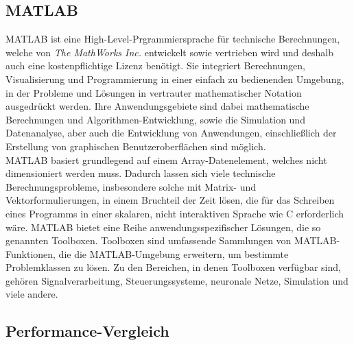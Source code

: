 
\subsection{MATLAB}

MATLAB ist eine High-Level-Prgrammiersprache für technische Berechnungen, welche von \textit{The MathWorks Inc.} entwickelt sowie vertrieben wird und deshalb auch eine kostenpflichtige Lizenz benötigt. Sie integriert Berechnungen, Visualisierung und Programmierung in einer einfach zu bedienenden Umgebung, in der Probleme und Lösungen in vertrauter mathematischer Notation ausgedrückt werden. Ihre Anwendungsgebiete sind dabei mathematische Berechnungen und Algorithmen-Entwicklung, sowie die Simulation und Datenanalyse, aber auch die Entwicklung von Anwendungen, einschließlich der Erstellung von graphischen Benutzeroberflächen sind möglich.\\
MATLAB basiert grundlegend auf einem Array-Datenelement, welches nicht dimensioniert werden muss. Dadurch lassen sich viele technische Berechnungsprobleme, insbesondere solche mit Matrix- und Vektorformulierungen, in einem Bruchteil der Zeit lösen, die für das Schreiben eines Programms in einer skalaren, nicht interaktiven Sprache wie C erforderlich wäre. MATLAB bietet eine Reihe anwendungsspezifischer Lösungen, die so genannten Toolboxen. Toolboxen sind umfassende Sammlungen von MATLAB-Funktionen, die die MATLAB-Umgebung erweitern, um bestimmte Problemklassen zu lösen. Zu den Bereichen, in denen Toolboxen verfügbar sind, gehören Signalverarbeitung, Steuerungssysteme, neuronale Netze, Simulation und viele andere.


\subsection{Performance-Vergleich}

